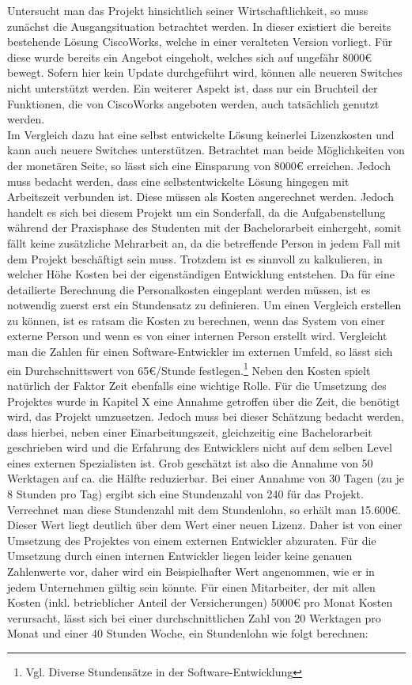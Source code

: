 Untersucht man das Projekt hinsichtlich seiner Wirtschaftlichkeit, so muss zunächst die Ausgangsituation betrachtet werden. In dieser existiert die bereits bestehende Lösung CiscoWorks, welche in einer veralteten Version vorliegt. Für diese wurde bereits ein Angebot eingeholt, welches sich auf ungefähr 8000€ bewegt. Sofern hier kein Update durchgeführt wird, können alle neueren Switches nicht unterstützt werden.
Ein weiterer Aspekt ist, dass nur ein Bruchteil der Funktionen, die von CiscoWorks angeboten werden, auch tatsächlich genutzt werden.\\
Im Vergleich dazu hat eine selbst entwickelte Lösung keinerlei Lizenzkosten und kann auch neuere Switches unterstützen. Betrachtet man beide Möglichkeiten von der monetären Seite, so lässt sich eine Einsparung von 8000€ erreichen. Jedoch muss bedacht werden, dass eine selbstentwickelte Lösung hingegen mit Arbeitszeit  verbunden ist.  Diese müssen als Kosten angerechnet werden. Jedoch handelt es sich bei diesem Projekt um ein Sonderfall, da die Aufgabenstellung während der Praxisphase des Studenten mit der Bachelorarbeit einhergeht, somit fällt keine zusätzliche Mehrarbeit an, da die betreffende Person in jedem Fall mit dem Projekt beschäftigt sein muss.
Trotzdem ist es sinnvoll zu kalkulieren, in welcher Höhe Kosten bei der eigenständigen Entwicklung entstehen.
Da für eine detailierte Berechnung die Personalkosten eingeplant werden müssen, ist es notwendig zuerst erst ein Stundensatz zu definieren.
Um einen Vergleich erstellen zu können, ist es ratsam die Kosten zu berechnen, wenn das System von einer externe Person und wenn es von einer internen Person erstellt wird.
Vergleicht man die Zahlen für einen Software-Entwickler im externen Umfeld, so lässt sich ein Durchschnittswert von 65€/Stunde festlegen.\footnote{Vgl. Diverse Stundensätze in der Software-Entwicklung}
Neben den Kosten spielt natürlich der Faktor Zeit ebenfalls eine wichtige Rolle. Für die Umsetzung des Projektes wurde in Kapitel X eine Annahme getroffen über die Zeit, die benötigt wird, das Projekt umzusetzen. Jedoch muss bei dieser Schätzung bedacht werden, dass hierbei, neben einer Einarbeitungszeit, gleichzeitig eine Bachelorarbeit geschrieben wird und die Erfahrung des Entwicklers nicht auf dem selben Level eines externen Spezialisten ist. Grob geschätzt ist also die Annahme von 50 Werktagen auf ca. die Hälfte reduzierbar. Bei einer Annahme von 30 Tagen (zu je 8 Stunden pro Tag) ergibt sich eine Stundenzahl von 240 für das Projekt.
Verrechnet man diese Stundenzahl mit dem Stundenlohn, so erhält man 15.600€. Dieser Wert liegt deutlich über dem Wert einer neuen Lizenz. Daher ist von einer Umsetzung des Projektes von einem externen Entwickler abzuraten. Für die Umsetzung durch einen internen Entwickler liegen leider keine genauen Zahlenwerte vor, daher wird ein Beispielhafter Wert angenommen, wie er in jedem Unternehmen gültig sein könnte. Für einen Mitarbeiter, der mit allen Kosten (inkl. betrieblicher Anteil der Versicherungen) 5000€ pro Monat Kosten verursacht, lässt sich bei einer durchschnittlichen Zahl von 20 Werktagen pro Monat und einer 40 Stunden Woche, ein Stundenlohn wie folgt berechnen:\\
